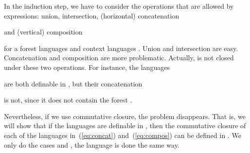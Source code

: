\documentclass{LMCS}
\begin{document}
In the induction step, we have to consider the operations that are
allowed by  expressions: union, intersection, (horizontal)
concatenation

and (vertical) composition

for a forest languages  and context languages . Union and intersection are easy. Concatenation and composition are more problematic. Actually, 
 is not closed under these two operations. For instance, the
languages

are both definable in , but their concatenation

is not, since it does not contain the forest . 

Nevertheless, if we use commutative closure, the problem disappears. That
is, we will show that if the languages  are definable in
\Stwo, then the commutative closure of each of the languages
in~(\ref{eq:concat}) and~(\ref{eq:compos}) can be defined in \Stwo.
We only do the cases  and , the language  is 
done the same way.
\end{document}
